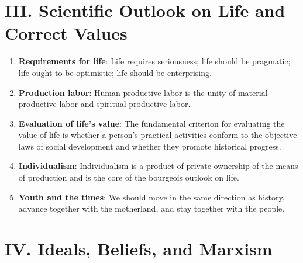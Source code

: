 \documentclass[11pt,a4paper]{ctexart}
\begin{document}
\section{III. Scientific Outlook on Life and Correct Values}

\begin{enumerate}[leftmargin=2em]
    \item \textbf{Requirements for life}: Life requires seriousness; life should be pragmatic; life ought to be optimistic; life should be enterprising.
    \item \textbf{Production labor}: Human productive labor is the unity of material productive labor and spiritual productive labor.
    \item \textbf{Evaluation of life's value}: The fundamental criterion for evaluating the value of life is whether a person's practical activities conform to the objective laws of social development and whether they promote historical progress.
    \item \textbf{Individualism}: Individualism is a product of private ownership of the means of production and is the core of the bourgeois outlook on life.
    \item \textbf{Youth and the times}: We should move in the same direction as history, advance together with the motherland, and stay together with the people.
\end{enumerate}

\section{IV. Ideals, Beliefs, and Marxism}
\end{document}
